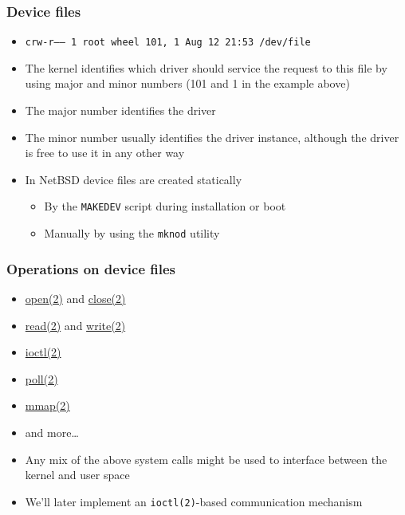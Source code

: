 \documentclass[dvipsnames,table]{beamer}
\begin{document}
\begin{frame}
\frametitle{Device files}
\begin{itemize}
	\scriptsize
	\item {\tt crw-r-----  1 root  wheel  101, 1 Aug 12 21:53 /dev/file}
	\normalsize
	\item The kernel identifies which driver should service the request to this file by using major and minor numbers (101 and 1 in the example above)
	\item The major number identifies the driver
	\item The minor number usually identifies the driver instance, although the driver is free to use it in any other way
	\item In NetBSD device files are created statically
	\begin{itemize}
		\item By the {\tt MAKEDEV} script during installation or boot
		\item Manually by using the {\tt mknod} utility
	\end{itemize}
\end{itemize}
\end{frame}

\begin{frame}
\frametitle{Operations on device files}
\begin{itemize}
	\item \href{http://netbsd.gw.com/cgi-bin/man-cgi?read++NetBSD-current}{open(2)} and \href{http://netbsd.gw.com/cgi-bin/man-cgi?read++NetBSD-current}{close(2)}
	\item \href{http://netbsd.gw.com/cgi-bin/man-cgi?read++NetBSD-current}{read(2)} and \href{http://netbsd.gw.com/cgi-bin/man-cgi?write++NetBSD-current}{write(2)}
	\item \href{http://netbsd.gw.com/cgi-bin/man-cgi?write++NetBSD-current}{ioctl(2)}
	\item \href{http://netbsd.gw.com/cgi-bin/man-cgi?poll++NetBSD-current}{poll(2)}
	\item \href{http://netbsd.gw.com/cgi-bin/man-cgi?write++NetBSD-current}{mmap(2)}
	\item and more\dots
	\item Any mix of the above system calls might be used to interface between the kernel and user space
	\item We'll later implement an {\tt ioctl(2)}-based communication mechanism

\end{itemize}
\end{frame}
\end{document}
